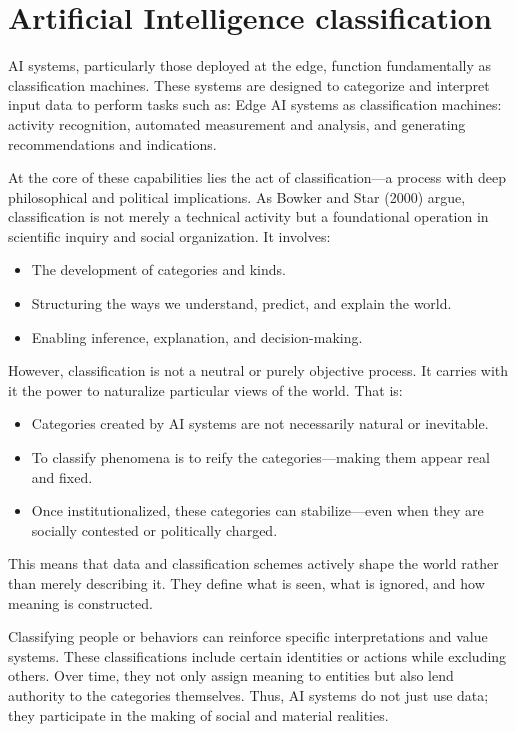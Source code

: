 \section{Artificial Intelligence classification}

AI systems, particularly those deployed at the edge, function fundamentally as classification machines. 
These systems are designed to categorize and interpret input data to perform tasks such as:
Edge AI systems as classification machines: activity recognition, automated measurement and analysis, and generating recommendations and indications. 

At the core of these capabilities lies the act of classification—a process with deep philosophical and political implications. 
As Bowker and Star (2000) argue, classification is not merely a technical activity but a foundational operation in scientific inquiry and social organization. 
It involves:
\begin{itemize}
    \item The development of categories and kinds.
    \item Structuring the ways we understand, predict, and explain the world.
    \item Enabling inference, explanation, and decision-making.
\end{itemize}
\noindent However, classification is not a neutral or purely objective process. It carries with it the power to naturalize particular views of the world. That is:
\begin{itemize}
    \item Categories created by AI systems are not necessarily natural or inevitable.
    \item To classify phenomena is to reify the categories—making them appear real and fixed.
    \item Once institutionalized, these categories can stabilize—even when they are socially contested or politically charged.
\end{itemize}
This means that data and classification schemes actively shape the world rather than merely describing it. 
They define what is seen, what is ignored, and how meaning is constructed.

Classifying people or behaviors can reinforce specific interpretations and value systems.
These classifications include certain identities or actions while excluding others.
Over time, they not only assign meaning to entities but also lend authority to the categories themselves.
Thus, AI systems do not just use data; they participate in the making of social and material realities.